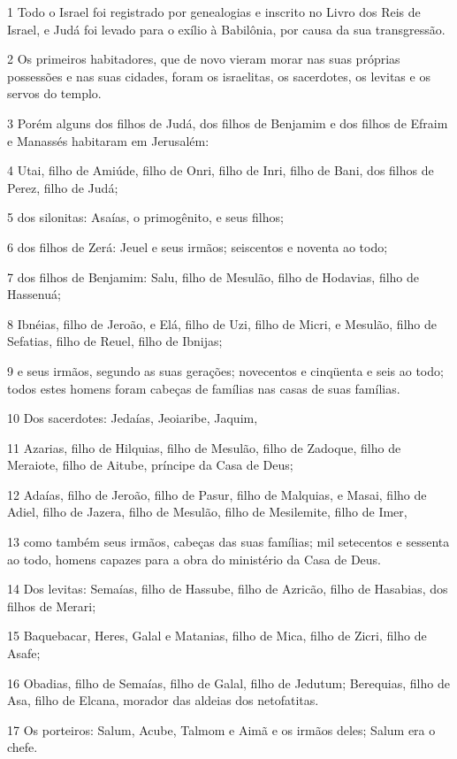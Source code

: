 \par 1 Todo o Israel foi registrado por genealogias e inscrito no Livro dos Reis de Israel, e Judá foi levado para o exílio à Babilônia, por causa da sua transgressão.
\par 2 Os primeiros habitadores, que de novo vieram morar nas suas próprias possessões e nas suas cidades, foram os israelitas, os sacerdotes, os levitas e os servos do templo.
\par 3 Porém alguns dos filhos de Judá, dos filhos de Benjamim e dos filhos de Efraim e Manassés habitaram em Jerusalém:
\par 4 Utai, filho de Amiúde, filho de Onri, filho de Inri, filho de Bani, dos filhos de Perez, filho de Judá;
\par 5 dos silonitas: Asaías, o primogênito, e seus filhos;
\par 6 dos filhos de Zerá: Jeuel e seus irmãos; seiscentos e noventa ao todo;
\par 7 dos filhos de Benjamim: Salu, filho de Mesulão, filho de Hodavias, filho de Hassenuá;
\par 8 Ibnéias, filho de Jeroão, e Elá, filho de Uzi, filho de Micri, e Mesulão, filho de Sefatias, filho de Reuel, filho de Ibnijas;
\par 9 e seus irmãos, segundo as suas gerações; novecentos e cinqüenta e seis ao todo; todos estes homens foram cabeças de famílias nas casas de suas famílias.
\par 10 Dos sacerdotes: Jedaías, Jeoiaribe, Jaquim,
\par 11 Azarias, filho de Hilquias, filho de Mesulão, filho de Zadoque, filho de Meraiote, filho de Aitube, príncipe da Casa de Deus;
\par 12 Adaías, filho de Jeroão, filho de Pasur, filho de Malquias, e Masai, filho de Adiel, filho de Jazera, filho de Mesulão, filho de Mesilemite, filho de Imer,
\par 13 como também seus irmãos, cabeças das suas famílias; mil setecentos e sessenta ao todo, homens capazes para a obra do ministério da Casa de Deus.
\par 14 Dos levitas: Semaías, filho de Hassube, filho de Azricão, filho de Hasabias, dos filhos de Merari;
\par 15 Baquebacar, Heres, Galal e Matanias, filho de Mica, filho de Zicri, filho de Asafe;
\par 16 Obadias, filho de Semaías, filho de Galal, filho de Jedutum; Berequias, filho de Asa, filho de Elcana, morador das aldeias dos netofatitas.
\par 17 Os porteiros: Salum, Acube, Talmom e Aimã e os irmãos deles; Salum era o chefe.
